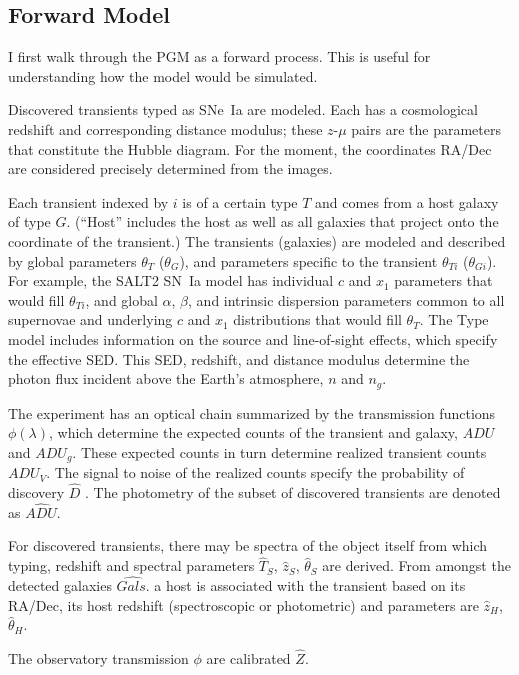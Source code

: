 \documentclass[preprint]{aastex}
\begin{document}
\subsection{Forward Model}
I first walk through the PGM as a forward process.  This is useful for understanding
how the model would be simulated.

Discovered transients typed as SNe~Ia are modeled.  Each has
a cosmological redshift and corresponding distance modulus; these $z$-$\mu$ pairs are the  parameters that
constitute the Hubble diagram.  For the moment, the coordinates RA/Dec are considered
precisely determined from the images.

Each transient indexed by $i$ is of a certain type $T$ and comes from a  host galaxy of type $G$.  
(``Host'' includes the host as well as  all galaxies that project onto the coordinate of
the transient.)  The
transients (galaxies) are modeled and described by global parameters $\theta_T$ ($\theta_G$),
and  parameters specific to the transient $\theta_{Ti}$ ($\theta_{Gi}$).  For example, the SALT2 SN~Ia
model has individual $c$ and $x_1$ parameters that would fill $\theta_{Ti}$,
and global $\alpha$, $\beta$, and intrinsic dispersion  parameters  common to all supernovae
 and  underlying  $c$ and $x_1$ distributions that would fill $\theta_T$.
The Type model includes  information on the
source and line-of-sight effects, which specify the effective SED. 
This SED, redshift, and  distance modulus determine the photon flux incident above the Earth's
atmosphere, $n$ and $n_g$.  

The experiment has an optical chain summarized by the transmission functions $\phi(\lambda)$, which determine the expected counts of the transient and galaxy, $\mathit{ADU}$ and
$\mathit{ADU}_g$.   These expected counts in turn determine realized  transient counts 
$\mathit{ADU}_V$.
The signal to noise of the realized counts specify the probability of discovery
$\hat{D}$ .    The photometry of the subset of discovered transients
are denoted as $\hat{\mathit{ADU}}$.

For discovered transients, there may be spectra of the object itself
from which typing, redshift and spectral parameters $\hat{T}_S$, $\hat{z}_S$, $\hat{\theta}_S$ are derived.
From amongst the detected galaxies $\hat{\mathit{Gals.}}$  a host is associated with the transient
based on its RA/Dec, its
host redshift (spectroscopic or photometric) and parameters are $\hat{z}_{H}$, $\hat{\theta}_H$.

The observatory transmission $\phi$ are calibrated $\hat{Z}$.
\end{document}
